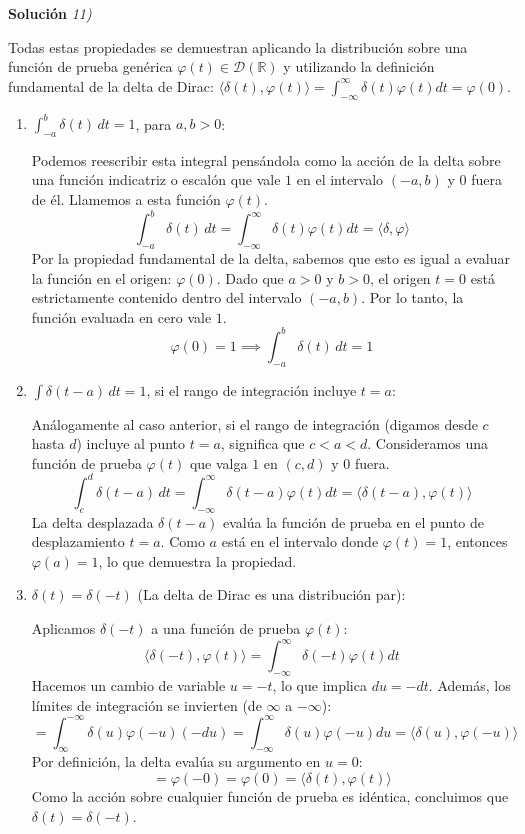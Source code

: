 \documentclass[11pt,spanish]{article}
\begin{document}
\vspace{0.5cm}
{\bf Soluci\'on }{\em 11)}
\vspace{0.5cm}


Todas estas propiedades se demuestran aplicando la distribución sobre una función de prueba genérica $\varphi(t) \in \mathcal{D}(\mathbb{R})$ y utilizando la definición fundamental de la delta de Dirac: $\langle \delta(t), \varphi(t) \rangle = \int_{-\infty}^{\infty} \delta(t)\varphi(t) dt = \varphi(0)$.

\begin{enumerate}

\item $\int_{-a}^{b} \delta(t)\,dt = 1$, para $a,b>0$:

Podemos reescribir esta integral pensándola como la acción de la delta sobre una función indicatriz o escalón que vale $1$ en el intervalo $(-a, b)$ y $0$ fuera de él. Llamemos a esta función $\varphi(t)$.
$$\int_{-a}^{b} \delta(t)\,dt = \int_{-\infty}^{\infty} \delta(t)\varphi(t) dt = \langle \delta, \varphi \rangle$$
Por la propiedad fundamental de la delta, sabemos que esto es igual a evaluar la función en el origen: $\varphi(0)$.
Dado que $a > 0$ y $b > 0$, el origen $t=0$ está estrictamente contenido dentro del intervalo $(-a, b)$. Por lo tanto, la función evaluada en cero vale $1$.
$$\varphi(0) = 1 \implies \int_{-a}^{b} \delta(t)\,dt = 1$$

\item $\int \delta(t-a)\,dt = 1$, si el rango de integración incluye $t=a$:

Análogamente al caso anterior, si el rango de integración (digamos desde $c$ hasta $d$) incluye al punto $t=a$, significa que $c < a < d$.
Consideramos una función de prueba $\varphi(t)$ que valga $1$ en $(c, d)$ y $0$ fuera.
$$\int_c^d \delta(t-a)\,dt = \int_{-\infty}^{\infty} \delta(t-a)\varphi(t) dt = \langle \delta(t-a), \varphi(t) \rangle$$
La delta desplazada $\delta(t-a)$ evalúa la función de prueba en el punto de desplazamiento $t=a$.
Como $a$ está en el intervalo donde $\varphi(t) = 1$, entonces $\varphi(a) = 1$, lo que demuestra la propiedad.

\item $\delta(t) = \delta(-t)$ (La delta de Dirac es una distribución par):

Aplicamos $\delta(-t)$ a una función de prueba $\varphi(t)$:
$$\langle \delta(-t), \varphi(t) \rangle = \int_{-\infty}^{\infty} \delta(-t)\varphi(t) dt$$
Hacemos un cambio de variable $u = -t$, lo que implica $du = -dt$. Además, los límites de integración se invierten (de $\infty$ a $-\infty$):
$$= \int_{\infty}^{-\infty} \delta(u)\varphi(-u)(-du) = \int_{-\infty}^{\infty} \delta(u)\varphi(-u) du = \langle \delta(u), \varphi(-u) \rangle$$
Por definición, la delta evalúa su argumento en $u=0$:
$$= \varphi(-0) = \varphi(0) = \langle \delta(t), \varphi(t) \rangle$$
Como la acción sobre cualquier función de prueba es idéntica, concluimos que $\delta(t) = \delta(-t)$.


\end{enumerate}
\end{document}
